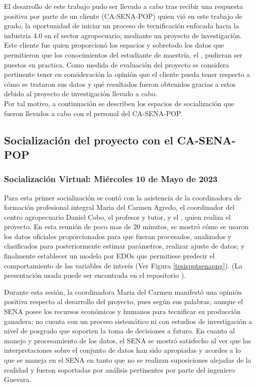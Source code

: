 El desarrollo de este trabajo pudo ser llevado a cabo tras recibir una respuesta positiva por parte de un cliente (CA-SENA-POP) quien vió en este trabajo de grado, la oportunidad de iniciar un proceso de tecnificación enfocada hacia la industria 4.0 en el sector agropecuario; mediante un proyecto de investigación. Este cliente fue quien proporcionó los espacios y sobretodo los datos que permitieron que los conocimientos del estudiante de maestría, el \authorA, pudieran ser puestos en practica. Como  medida de evaluación del proyecto se considera pertinente tener en consideración la opinión que el cliente pueda tener respecto a cómo se trataron sus datos y qué resultados fueron obtenidos gracias a estos debido al proyecto de investigación llevado a cabo.\\

Por tal motivo, a continuación se describen los espacios de socialización que fueron llevados a cabo con el personal del CA-SENA-POP.

\subsection{Socialización del proyecto con el CA-SENA-POP}
\subsubsection{Socialización Virtual: Miércoles 10 de Mayo de 2023}
Para esta primer socialización se contó con la asistencia de la coordinadora de formación profesional integral Maria del Carmen Agredo, el coordinador del centro agropecuario Daniel Cobo, el profesor y tutor, \director \hspace{0.1cm} y el \authorA, \hspace{0.1cm}quien realiza el proyecto. En esta reunión de poco mas de 20 minutos, se mostró cómo se usaron los datos oficiales proporcionados para que fueran procesados, analizados y clasificados para posteriormente estimar parámetros, realizar ajuste de datos; y finalmente establecer un modelo por EDOs que permitiese predecir el comportamiento de las variables de interés (Ver Figura \ref{tesispptsenapng}). (La presentación usada puede ser encontrada en el repositorio \cite{msclfggrepo}).

Durante esta sesión, la coordinadora Maria del Carmen manifestó una opinión positiva respecto al desarrollo del proyecto, pues según sus palabras, aunque el SENA posee los recursos económicos y humanos para tecnificar su producción ganadera; no cuenta con un proceso sistemático ni con estudios de investigación a nivel de posgrado que soporten la toma de decisiones a futuro.
En cuanto al manejo y procesamiento de los datos, el SENA se mostró satisfecho al ver que las interpretaciones sobre el conjunto de datos han sido apropiadas y acordes a lo que se maneja en el SENA en tanto que no se realizan suposiciones alejadas de la realidad y fueron soportadas por análisis pertinentes por parte del ingeniero Guevara.\\

